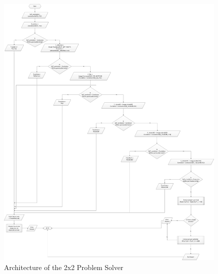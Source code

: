 \documentclass[10pt, letter]{article}
\begin{document}
\begin{figure}[h!]
  \centering
    \includegraphics[scale = 0.25]{Images/Fig7}
    \caption{Architecture of the 2x2 Problem Solver}
  \label{fig7}
\end{figure}
\end{document}
